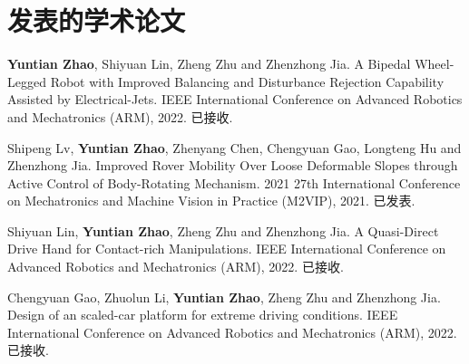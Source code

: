 \documentclass[AutoFakeBold,AutoFakeSlant,language=chinese,degree=bachelor,zihao=-4]{sustechthesis}
\begin{document}

\clearpage %

\begin{spacing}{1.5}
\clearpage
\clearpage
\clearpage
\clearpage
\clearpage
\clearpage
\end{spacing}
  \def\bibfont{\fontsize{10.5}{18}\selectfont}
  \printbibliography[heading=none]\clearpage
{}
  \clearpage
{}
  \clearpage
  

\section*{发表的学术论文}

\begin{achievements}

    \item \textbf{Yuntian Zhao}, Shiyuan Lin, Zheng Zhu and Zhenzhong Jia. A Bipedal Wheel-Legged Robot with Improved Balancing and Disturbance Rejection Capability Assisted by Electrical-Jets. IEEE International Conference on Advanced Robotics and Mechatronics (ARM), 2022. 已接收.
    
    \item Shipeng Lv, \textbf{Yuntian Zhao}, Zhenyang Chen, Chengyuan Gao, Longteng Hu and Zhenzhong Jia. Improved Rover Mobility Over Loose Deformable Slopes through Active Control of Body-Rotating Mechanism. 2021 27th International Conference on Mechatronics and Machine Vision in Practice (M2VIP), 2021. 已发表.
    
    \item Shiyuan Lin, \textbf{Yuntian Zhao}, Zheng Zhu and Zhenzhong Jia. A Quasi-Direct Drive Hand for Contact-rich Manipulations. IEEE International Conference on Advanced Robotics and Mechatronics (ARM), 2022. 已接收.
    
    \item Chengyuan Gao, Zhuolun Li, \textbf{Yuntian Zhao}, Zheng Zhu and Zhenzhong Jia. Design of an scaled-car platform for extreme driving conditions. IEEE International Conference on Advanced Robotics and Mechatronics (ARM), 2022. 已接收.
    
\end{achievements}
\end{document}
